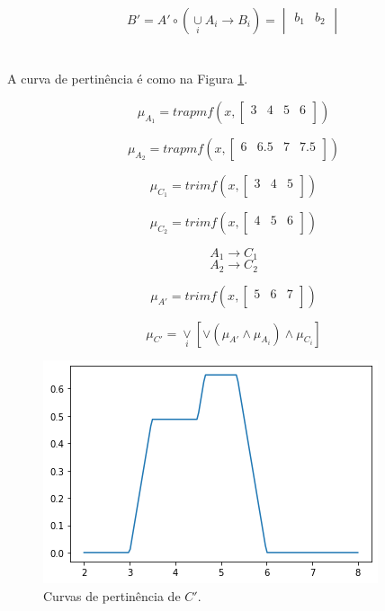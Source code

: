 \documentclass[conference]{IEEEtran}
\newcommand\w{1.0}
\begin{document}
\hfill

\[
B' = A' \circ (\underset{i}{\cup} A_i \rightarrow B_i) =
\begin{vmatrix}
b_1 & b_2 \\
\end{vmatrix}
\]

\hfill
\section{}  %

\par A curva de pertinência é como na Figura \ref{fig:plot06}.

\[
\mu_{A_1} = trapmf(x, 
\begin{bmatrix}
3 & 4 & 5 & 6 \\
\end{bmatrix})
\]

\[
\mu_{A_2} = trapmf(x, 
\begin{bmatrix}
6 & 6.5 & 7 & 7.5 \\
\end{bmatrix})
\]

\[
\mu_{C_1} = trimf(x, 
\begin{bmatrix}
3 & 4 & 5 \\
\end{bmatrix})
\]

\[
\mu_{C_2} = trimf(x, 
\begin{bmatrix}
4 & 5 & 6 \\
\end{bmatrix})
\]

\[A_1 \rightarrow C_1\]
\[A_2 \rightarrow C_2\]

\[
\mu_{A'} = trimf(x, 
\begin{bmatrix}
5 & 6 & 7 \\
\end{bmatrix})
\]

\hfill

\[
\mu_{C'} = \underset{i}{\vee} [\vee (\mu_{A'} \wedge \mu_{A_i}) \wedge \mu_{C_i}]
\]

\begin{figure}[t!]
\centering
\includegraphics[width=\w\linewidth]{fig/plot06.png}
\caption{Curvas de pertinência de $C'$.}
\label{fig:plot06}
\end{figure}
\end{document}
